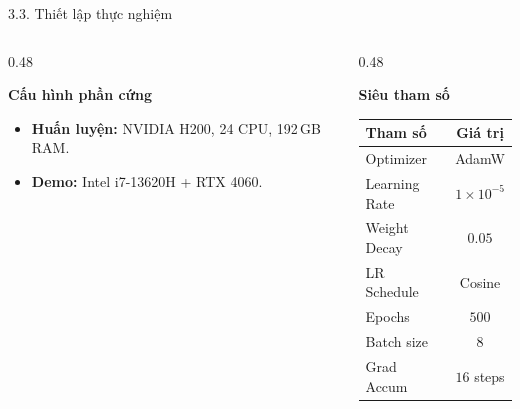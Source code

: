 \documentclass[11pt]{beamer}
\begin{document}
\begin{frame}{3.3. Thiết lập thực nghiệm}
\scriptsize

\begin{columns}[T,onlytextwidth]
\begin{column}{0.48\textwidth}

\begin{block}{\textbf{Cấu hình phần cứng}}
\begin{itemize}
  \item \textbf{Huấn luyện:} NVIDIA H200, 24 CPU, 192\,GB RAM.
  \item \textbf{Demo:} Intel i7-13620H + RTX 4060.
\end{itemize}
\end{block}

\end{column}

\begin{column}{0.48\textwidth}

\begin{block}{\textbf{Siêu tham số}}
\centering
\renewcommand{\arraystretch}{1.1}
\begin{tabular}{|l|c|}
\hline
\rowcolor{blue!10}
\textbf{Tham số} & \textbf{Giá trị} \\
\hline
Optimizer & AdamW \\
\hline
Learning Rate & $1{\times}10^{-5}$ \\
\hline
Weight Decay & $0.05$ \\
\hline
LR Schedule & Cosine \\
\hline
Epochs & $500$ \\
\hline
Batch size & $8$ \\
\hline
Grad Accum & $16$ steps \\
\hline
\end{tabular}
\end{block}

\end{column}
\end{columns}

\end{frame}
\end{document}
